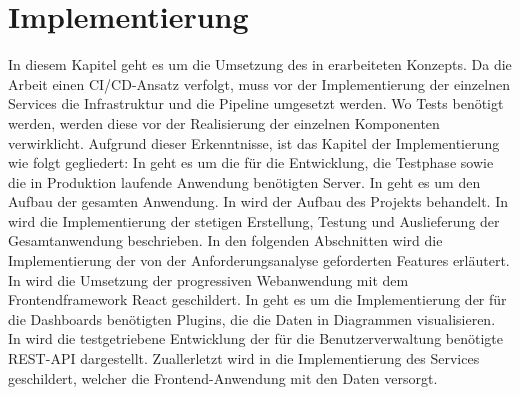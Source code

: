 \chapter{Implementierung}
\label{chap:implementierung}
In diesem Kapitel geht es um die Umsetzung des in  erarbeiteten
Konzepts. Da die Arbeit einen CI/CD-Ansatz verfolgt, muss vor der Implementierung
der einzelnen Services die Infrastruktur und die Pipeline umgesetzt werden. 
Wo Tests benötigt werden, werden diese vor der Realisierung der einzelnen
Komponenten verwirklicht. Aufgrund dieser Erkenntnisse, ist das Kapitel der
Implementierung wie folgt gegliedert: In  geht es um
die für die Entwicklung, die Testphase sowie die in Produktion laufende Anwendung
benötigten Server. In  geht es um den Aufbau der gesamten
Anwendung. In  wird der Aufbau des Projekts behandelt.
In  wird die Implementierung der stetigen Erstellung, Testung und
Auslieferung der Gesamtanwendung beschrieben. In den folgenden Abschnitten wird die
Implementierung der von der Anforderungsanalyse geforderten Features erläutert.
In  wird die Umsetzung der progressiven \mbox{Webanwendung}
mit dem Frontendframework React geschildert. In  geht es um die
Implementierung der für die Dashboards benötigten Plugins, die die Daten
in Diagrammen visualisieren. In  wird
die testgetriebene Entwicklung der für die Benutzerverwaltung benötigte REST-API
dargestellt. Zuallerletzt wird in  die Implementierung
des Services geschildert, welcher die Frontend-Anwendung mit den Daten versorgt.

